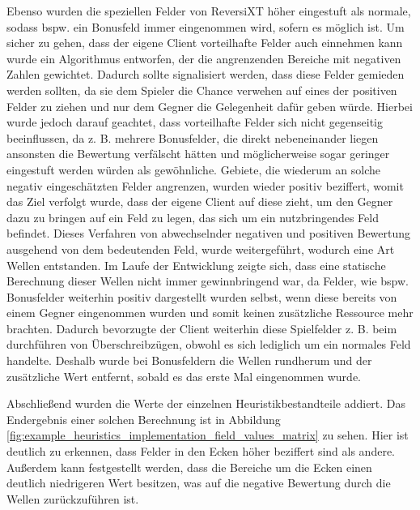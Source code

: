 \documentclass[12pt,a4paper,bibliography=totocnumbered,listof=totocnumbered]{article}
\begin{document}
Ebenso wurden die speziellen Felder von ReversiXT höher eingestuft als normale, sodass bspw. ein Bonusfeld immer eingenommen wird, sofern es möglich ist.
Um sicher zu gehen, dass der eigene Client vorteilhafte Felder auch einnehmen kann wurde ein Algorithmus entworfen, der die angrenzenden Bereiche mit negativen Zahlen gewichtet. Dadurch sollte signalisiert werden, dass diese Felder gemieden werden sollten, da sie dem Spieler die Chance verwehen auf eines der positiven Felder zu ziehen und nur dem Gegner die Gelegenheit dafür geben würde. Hierbei wurde jedoch darauf geachtet, dass vorteilhafte Felder sich nicht gegenseitig beeinflussen, da z. B. mehrere Bonusfelder, die direkt nebeneinander liegen ansonsten die Bewertung verfälscht hätten und möglicherweise sogar geringer eingestuft werden würden als gewöhnliche. Gebiete, die wiederum an solche negativ eingeschätzten Felder angrenzen, wurden wieder positiv beziffert, womit das Ziel verfolgt wurde, dass der eigene Client auf diese zieht, um den Gegner dazu zu bringen auf ein Feld zu legen, das sich um ein nutzbringendes Feld befindet. Dieses Verfahren von abwechselnder negativen und positiven Bewertung ausgehend von dem bedeutenden Feld, wurde weitergeführt, wodurch eine Art Wellen entstanden.
Im Laufe der Entwicklung zeigte sich, dass eine statische Berechnung dieser Wellen nicht immer gewinnbringend war, da Felder, wie bspw. Bonusfelder weiterhin positiv dargestellt wurden selbst, wenn diese bereits von einem Gegner eingenommen wurden und somit keinen zusätzliche Ressource mehr brachten. Dadurch bevorzugte der Client weiterhin diese Spielfelder z. B. beim durchführen von Überschreibzügen, obwohl es sich lediglich um ein normales Feld handelte. Deshalb wurde bei Bonusfeldern die Wellen rundherum und der zusätzliche Wert entfernt, sobald es das erste Mal eingenommen wurde.

Abschließend wurden die Werte der einzelnen Heuristikbestandteile addiert. Das Endergebnis einer solchen Berechnung ist in Abbildung \ref{fig:example_heuristics_implementation_field_values_matrix} zu sehen. Hier ist deutlich zu erkennen, dass Felder in den Ecken höher beziffert sind als andere. Außerdem kann festgestellt werden, dass die Bereiche um die Ecken einen deutlich niedrigeren Wert besitzen, was auf die negative Bewertung durch die Wellen zurückzuführen ist.
\end{document}
